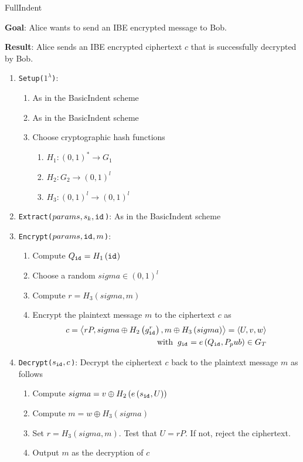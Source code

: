 \begin{algorithm}
\caption{FullIndent~\cite{art:BonehF01}}
\label{alg:full_indent}
 \textbf{Goal}: Alice wants to send an IBE encrypted message to Bob.
 
 \textbf{Result}: Alice sends an IBE encrypted ciphertext $c$ that is successfully decrypted by Bob.
 \begin{enumerate}
  \item \texttt{Setup($1^{\lambda}$)}: 
  \begin{enumerate}
   \item As in the BasicIndent scheme
   \item As in the BasicIndent scheme
   \item Choose cryptographic hash functions
    \begin{enumerate}
     \item $H_1: \left( 0,1  \right)^* \rightarrow G_1$
     \item $H_2: G_2 \rightarrow \left( 0,1 \right)^l$
     \item $H_3: \left( 0,1 \right)^l \rightarrow \left( 0,1 \right)^l$
    \end{enumerate}
  \end{enumerate}
  \item \texttt{Extract($params, s_k, \mathtt{id}_{}$)}: As in the BasicIndent scheme
   \item \texttt{Encrypt($params, \mathtt{id}_{}, m$)}:
   \begin{enumerate}
    \item Compute $Q_{\mathtt{id}_{}} = H_1 \left( \mathtt{id}_{} \right)$
    \item Choose a random $sigma \in \left( 0,1 \right)^l$
    \item Compute $r = H_3 \left( sigma, m \right)$
    \item Encrypt the plaintext message $m$ to the ciphertext $c$ as
    \begin{equation*}
     \begin{split}
      c = \left< rP, sigma \oplus H_2 \left( g_{\mathtt{id}_{}}^r\right), m \oplus H_3 \left( sigma \right) \right> = \left< U, v, w \right> \\ 
     \; \; \textrm{with} \; \; g_{\mathtt{id}_{}} = e \left( Q_{\mathtt{id}_{}}, P_pub \right) \in G_T
     \end{split}
    \end{equation*}
   \end{enumerate}
   \item \texttt{Decrypt($s_{\mathtt{id}_{}}, c$)}: Decrypt the ciphertext $c$ back to the plaintext message $m$ as follows
   \begin{enumerate}
    \item Compute $sigma = v \oplus H_2 \left( e \left( s_{\mathtt{id}_{}}, U \right) \right)$
    \item Compute $m = w \oplus H_3 \left( sigma \right)$
    \item Set $r = H_3 \left( sigma, m \right)$. Test that $U = rP$. If not, reject the ciphertext.
    \item Output $m$ as the decryption of $c$
    \end{enumerate}
 \end{enumerate}
\end{algorithm}



